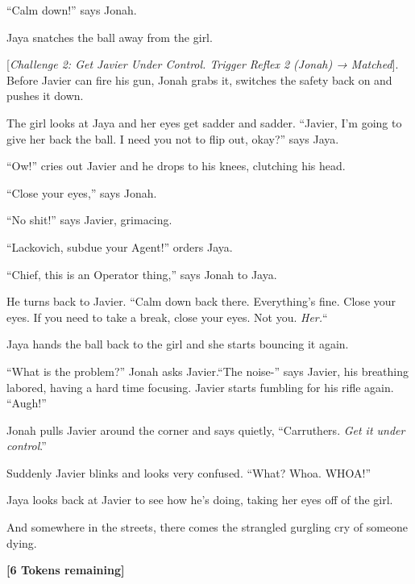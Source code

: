 ``Calm down!'' says Jonah.

Jaya snatches the ball away from the girl.

{[}\textit{Challenge 2: Get Javier Under Control.  Trigger Reflex 2 (Jonah) → Matched}{]}. Before Javier can fire his gun, Jonah grabs it, switches the safety back on and pushes it down. 

The girl looks at Jaya and her eyes get sadder and sadder.  ``Javier, I'm going to give her back the ball.  I need you not to flip out, okay?'' says Jaya.

``Ow!'' cries out Javier and he drops to his knees, clutching his head.

``Close your eyes,'' says Jonah.

``No shit!'' says Javier, grimacing.

``Lackovich, subdue your Agent!'' orders Jaya.

``Chief, this is an Operator thing,'' says Jonah to Jaya.

He turns back to Javier.  ``Calm down back there.  Everything's fine.  Close your eyes.  If you need to take a break, close your eyes.  Not you.  \textit{Her.}``  

Jaya hands the ball back to the girl and she starts bouncing it again.

``What is the problem?'' Jonah asks Javier.``The noise-'' says Javier, his breathing labored, having a hard time focusing.  Javier starts fumbling for his rifle again. ``Augh!''

Jonah pulls Javier around the corner and says quietly, ``Carruthers.  \textit{Get it under control}.''

Suddenly Javier blinks and looks very confused.  ``What?  Whoa.  WHOA!''

Jaya looks back at Javier to see how he's doing, taking her eyes off of the girl.



And somewhere in the streets, there comes the strangled gurgling cry of someone dying.





\textbf{{[}6 Tokens remaining{]}}









